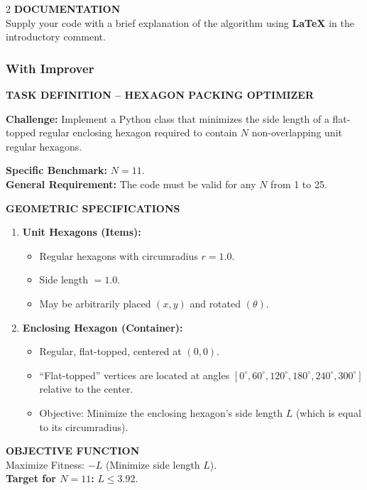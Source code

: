 \documentclass[sigconf]{acmart}
\begin{document}
\begin{paracol}{2}
\noindent \textbf{DOCUMENTATION}\\
Supply your code with a brief explanation of the algorithm using \textbf{LaTeX} in the introductory comment.

\switchcolumn
\subsubsection{With Improver}

\noindent \textbf{TASK DEFINITION -- HEXAGON PACKING OPTIMIZER}

\vspace{0.3cm}
\noindent \textbf{Challenge:} Implement a Python class that minimizes the side length of a flat-topped regular enclosing hexagon required to contain $N$ non-overlapping unit regular hexagons.

\vspace{0.3cm}
\noindent \textbf{Specific Benchmark:} $N=11$.\\
\textbf{General Requirement:} The code must be valid for any $N$ from 1 to 25.

\vspace{0.3cm}
\noindent \textbf{GEOMETRIC SPECIFICATIONS}
\begin{enumerate}
    \item \textbf{Unit Hexagons (Items):}
    \begin{itemize}
        \item Regular hexagons with circumradius $r = 1.0$.
        \item Side length $= 1.0$.
        \item May be arbitrarily placed $(x, y)$ and rotated $(\theta)$.
    \end{itemize}
    \item \textbf{Enclosing Hexagon (Container):}
    \begin{itemize}
        \item Regular, flat-topped, centered at $(0,0)$.
        \item ``Flat-topped'' vertices are located at angles $[0^\circ,\allowbreak 60^\circ,\allowbreak 120^\circ,\allowbreak 180^\circ,\allowbreak 240^\circ,\allowbreak 300^\circ]$ relative to the center.
        \item Objective: Minimize the enclosing hexagon's side length $L$ (which is equal to its circumradius).
    \end{itemize}
\end{enumerate}

\noindent \textbf{OBJECTIVE FUNCTION}\\
Maximize Fitness: $-L$ (Minimize side length $L$).\\
\textbf{Target for $N=11$:} $L \le 3.92$.


\end{paracol}
\end{document}
